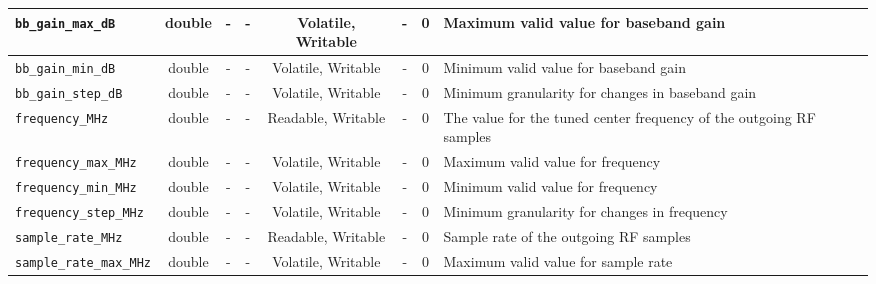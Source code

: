 \documentclass{article}
\begin{document}
\begin{landscape}
\begin{scriptsize}
\begin{tabular}{|p{4cm}|c|c|c|c|c|c|p{8cm}|}
			\hline
			\verb+bb_gain_max_dB+               & double & -        & -          & Volatile, Writable & -           & 0       & Maximum valid value for baseband gain                                                                                                       \\
			\hline
			\verb+bb_gain_min_dB+               & double & -        & -          & Volatile, Writable & -           & 0       & Minimum valid value for baseband gain                                                                                                       \\
			\hline
			\verb+bb_gain_step_dB+              & double & -        & -          & Volatile, Writable & -           & 0       & Minimum granularity for changes in baseband gain                                                                                            \\
			\hline
			\verb+frequency_MHz+                & double & -        & -          & Readable, Writable  & -           & 0       & The value for the tuned center frequency of the outgoing RF samples                                                                         \\
			\hline
			\verb+frequency_max_MHz+            & double & -        & -          & Volatile, Writable & -           & 0       & Maximum valid value for frequency                                                                                                           \\
			\hline
			\verb+frequency_min_MHz+            & double & -        & -          & Volatile, Writable & -           & 0       & Minimum valid value for frequency                                                                                                           \\
			\hline
			\verb+frequency_step_MHz+           & double & -        & -          & Volatile, Writable & -           & 0       & Minimum granularity for changes in frequency                                                                                                \\
			\hline
			\verb+sample_rate_MHz+              & double & -        & -          & Readable, Writable  & -           & 0       & Sample rate of the outgoing RF samples                                                                                                      \\
			\hline
			\verb+sample_rate_max_MHz+          & double & -        & -          & Volatile, Writable & -           & 0       & Maximum valid value for sample rate                                                                                                         \\

\end{tabular}
\end{scriptsize}
\end{landscape}
\end{document}
